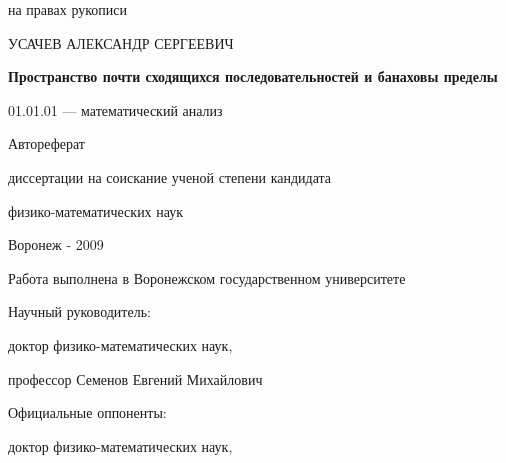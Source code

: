 \documentclass[12pt]{article}
\begin{document}
\large

\thispagestyle{empty}

\begin{flushright}
на правах рукописи
\end{flushright}

\vspace{25mm}

\begin{center}
УСАЧЕВ АЛЕКСАНДР СЕРГЕЕВИЧ
\end{center}

\vspace{25mm}

\begin{center}
\textbf{Пространство почти сходящихся последовательностей и
банаховы пределы}
\end{center}

\vspace{10mm}

\begin{center}
01.01.01 --- математический анализ
\end{center}

\vspace{5mm}

\begin{center}
Автореферат

диссертации на соискание ученой степени кандидата

физико-математических наук
\end{center}

\vspace{75mm}

\begin{center}
Воронеж - 2009
\end{center}


\newpage
\thispagestyle{empty}

Работа выполнена в Воронежском государственном университете

\vspace{10mm}

Научный руководитель:

\hspace{25mm}доктор физико-математических наук,

\hspace{25mm}профессор Семенов Евгений Михайлович

\vspace{10mm}

Официальные оппоненты:

\hspace{25mm}доктор физико-математических наук,
\end{document}

